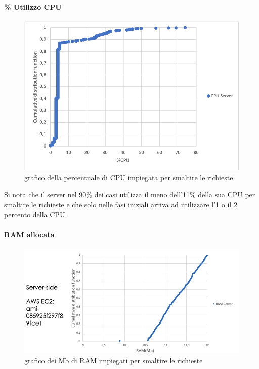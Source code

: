 \paragraph{\% Utilizzo CPU}
\begin{figure}[h!t]
    \centering
    \includegraphics[width=15cm]{Figure/quantitativa/CPUserver.pdf}
    \caption{grafico della percentuale di CPU impiegata per smaltire le richieste}
    \label{fig:srvCPU}
\end{figure}
\FloatBarrier

Si nota che il server nel 90\% dei casi utilizza il meno dell'11\% della sua CPU per smaltire le richieste  e che solo nelle fasi iniziali arriva ad utilizzare l'1 o il 2 percento della CPU.

\paragraph{RAM allocata}
\begin{figure}[h!t]
    \centering
    \includegraphics[width=15cm]{Figure/quantitativa/quant_RAM-srv.png}
    \caption{grafico dei Mb di RAM impiegati per smaltire le richieste}
    \label{fig:srvRAM}
\end{figure}
\FloatBarrier

